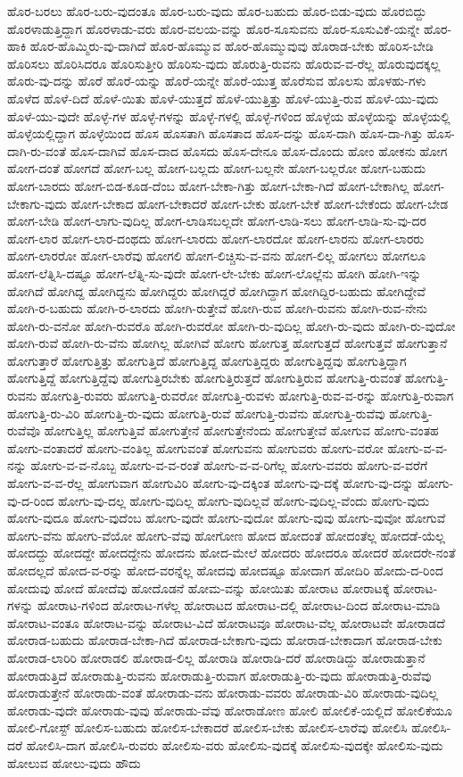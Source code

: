 {ಹೊರ-ಬರಲು
ಹೊರ-ಬರು-ವುದಂತೂ
ಹೊರ-ಬರು-ವುದು
ಹೊರ-ಬಹುದು
ಹೊರ-ಬಿಡು-ವುದು
ಹೊರಬಿದ್ದು
ಹೊರಳಾಡುತ್ತಿದ್ದಾಗ
ಹೊರಳಾಡು-ವರು
ಹೊರ-ವಲಯ-ವನ್ನು
ಹೊರ-ಸೂಸುವನು
ಹೊರ-ಸೂಸುವಿಕೆ-ಯನ್ನೇ
ಹೊರ-ಹಾಕಿ
ಹೊರ-ಹೊಮ್ಮಿರು-ವು-ದಾಗಿದೆ
ಹೊರ-ಹೊಮ್ಮುವ
ಹೊರ-ಹೊಮ್ಮುವುವು
ಹೊರಾಡ-ಬೇಕು
ಹೊರಿಸ-ಬೇಡಿ
ಹೊರಿಸಲು
ಹೊರಿಸಿದರೂ
ಹೊರಿಸುತ್ತೀರಿ
ಹೊರಿಸು-ವುದು
ಹೊರುತ್ತಿ-ರುವನು
ಹೊರುವ-ವ-ರೆಲ್ಲ
ಹೊರುವುದಕ್ಕಲ್ಲ
ಹೊರು-ವು-ದನ್ನು
ಹೊರೆ
ಹೊರೆ-ಯನ್ನು
ಹೊರೆ-ಯನ್ನೇ
ಹೊರೆ-ಯುತ್ತ
ಹೊರೆಸುವ
ಹೊಲಸು
ಹೊಳಹು-ಗಳು
ಹೊಳೆದ
ಹೊಳೆ-ದಿದೆ
ಹೊಳೆ-ಯಿತು
ಹೊಳೆ-ಯುತ್ತದೆ
ಹೊಳೆ-ಯುತ್ತಿತ್ತು
ಹೊಳೆ-ಯುತ್ತಿ-ರುವ
ಹೊಳೆ-ಯು-ವುದು
ಹೊಳೆ-ಯು-ವುದೇ
ಹೊಳ್ಳೆ-ಗಳ
ಹೊಳ್ಳೆ-ಗಳನ್ನು
ಹೊಳ್ಳೆ-ಗಳಲ್ಲಿ
ಹೊಳ್ಳೆ-ಗಳಿಂದ
ಹೊಳ್ಳೆಯ
ಹೊಳ್ಳೆಯನ್ನು
ಹೊಳ್ಳೆಯಲ್ಲಿ
ಹೊಳ್ಳೆಯಲ್ಲಿದ್ದಾಗ
ಹೊಳ್ಳೆಯಿಂದ
ಹೊಸ
ಹೊಸತಾಗಿ
ಹೊಸತಾದ
ಹೊಸ-ದನ್ನು
ಹೊಸ-ದಾಗಿ
ಹೊಸ-ದಾ-ಗಿತ್ತು
ಹೊಸ-ದಾಗಿ-ರು-ವಂತೆ
ಹೊಸ-ದಾಗಿವೆ
ಹೊಸ-ದಾದ
ಹೊಸದು
ಹೊಸ-ದೇನೂ
ಹೊಸ-ದೊಂದು
ಹೋಂ
ಹೋಕನು
ಹೋಗ
ಹೋಗ-ದಂತೆ
ಹೋಗದೆ
ಹೋಗ-ಬಲ್ಲ
ಹೋಗ-ಬಲ್ಲದು
ಹೋಗ-ಬಲ್ಲನೇ
ಹೋಗ-ಬಲ್ಲರೋ
ಹೋಗ-ಬಹುದು
ಹೋಗ-ಬಾರದು
ಹೋಗ-ಬಿಡ-ಕೂಡ-ದೆಂಬ
ಹೋಗ-ಬೇಕಾ-ಗಿತ್ತು
ಹೋಗ-ಬೇಕಾ-ಗಿದೆ
ಹೋಗ-ಬೇಕಾಗಿಲ್ಲ
ಹೋಗ-ಬೇಕಾಗು-ವುದು
ಹೋಗ-ಬೇಕಾದ
ಹೋಗ-ಬೇಕಾದರೆ
ಹೋಗ-ಬೇಕು
ಹೋಗ-ಬೇಕೆ
ಹೋಗ-ಬೇಕೆಂದು
ಹೋಗ-ಬೇಡ
ಹೋಗ-ಬೇಡಿ
ಹೋಗ-ಲಾಗು-ವುದಿಲ್ಲ
ಹೋಗ-ಲಾಡಿಸಬಲ್ಲದೇ
ಹೋಗ-ಲಾಡಿ-ಸಲು
ಹೋಗ-ಲಾಡಿ-ಸು-ವು-ದರ
ಹೋಗ-ಲಾರ
ಹೋಗ-ಲಾರ-ದಂಥದು
ಹೋಗ-ಲಾರದು
ಹೋಗ-ಲಾರದೋ
ಹೋಗ-ಲಾರನು
ಹೋಗ-ಲಾರರು
ಹೋಗ-ಲಾರರೋ
ಹೋಗ-ಲಾರೆವು
ಹೋಗಲಿ
ಹೋಗ-ಲಿಚ್ಚಿಸು-ವ-ವನು
ಹೋಗ-ಲಿಲ್ಲ
ಹೋಗಲು
ಹೋಗಲೂ
ಹೋಗ-ಲೆತ್ನಿಸಿ-ದಷ್ಟೂ
ಹೋಗ-ಲೆತ್ನಿ-ಸು-ವುದೇ
ಹೋಗ-ಲೇ-ಬೇಕು
ಹೋಗ-ಲೊಲ್ಲೆನು
ಹೋಗಿ
ಹೋಗಿ-ಇನ್ನು
ಹೋಗಿದೆ
ಹೋಗಿದ್ದ
ಹೋಗಿದ್ದನು
ಹೋಗಿದ್ದರು
ಹೋಗಿದ್ದರೆ
ಹೋಗಿದ್ದಾಗ
ಹೋಗಿದ್ದಿರ-ಬಹುದು
ಹೋಗಿದ್ದೇವೆ
ಹೋಗಿ-ರ-ಬಹುದು
ಹೋಗಿ-ರ-ಲಾರದು
ಹೋಗಿ-ರುತ್ತೇವೆ
ಹೋಗಿ-ರುವ
ಹೋಗಿ-ರುವನು
ಹೋಗಿ-ರುವ-ನೇನು
ಹೋಗಿ-ರು-ವನೋ
ಹೋಗಿ-ರುವರೊ
ಹೋಗಿ-ರುವರೋ
ಹೋಗಿ-ರು-ವುದಿಲ್ಲ
ಹೋಗಿ-ರು-ವುದು
ಹೋಗಿ-ರು-ವುದೋ
ಹೋಗಿ-ರುವೆ
ಹೋಗಿ-ರು-ವೆನು
ಹೋಗಿಲ್ಲ
ಹೋಗಿವೆ
ಹೋಗು
ಹೋಗುತ್ತ
ಹೋಗುತ್ತದೆ
ಹೋಗುತ್ತವೆ
ಹೋಗುತ್ತಾನೆ
ಹೋಗುತ್ತಾರೆ
ಹೋಗುತ್ತಿತ್ತು
ಹೋಗುತ್ತಿದೆ
ಹೋಗುತ್ತಿದ್ದ
ಹೋಗುತ್ತಿದ್ದರು
ಹೋಗುತ್ತಿದ್ದವು
ಹೋಗುತ್ತಿದ್ದಾಗ
ಹೋಗುತ್ತಿದ್ದೆ
ಹೋಗುತ್ತಿದ್ದೆವು
ಹೋಗುತ್ತಿರಬೇಕು
ಹೋಗುತ್ತಿರುತ್ತದೆ
ಹೋಗುತ್ತಿರುವ
ಹೋಗುತ್ತಿ-ರುವಂತೆ
ಹೋಗುತ್ತಿ-ರುವನು
ಹೋಗುತ್ತಿ-ರುವರು
ಹೋಗುತ್ತಿ-ರುವರೋ
ಹೋಗುತ್ತಿ-ರುವಳು
ಹೋಗುತ್ತಿ-ರುವ-ವ-ರನ್ನು
ಹೋಗುತ್ತಿ-ರುವಾಗ
ಹೋಗುತ್ತಿ-ರು-ವಿರಿ
ಹೋಗುತ್ತಿ-ರು-ವುದು
ಹೋಗುತ್ತಿ-ರುವೆ
ಹೋಗುತ್ತಿ-ರುವೆನು
ಹೋಗುತ್ತಿ-ರುವೆವು
ಹೋಗುತ್ತಿ-ರುವೆವೊ
ಹೋಗುತ್ತಿಲ್ಲ
ಹೋಗುತ್ತಿವೆ
ಹೋಗುತ್ತೇನೆ
ಹೋಗುತ್ತೇನೆಂದು
ಹೋಗುತ್ತೇವೆ
ಹೋಗುವ
ಹೋಗು-ವಂತಹ
ಹೋಗು-ವಂತಾದರೆ
ಹೋಗು-ವಂತಿಲ್ಲ
ಹೋಗುವಂತೆ
ಹೋಗುವನು
ಹೋಗುವರು
ಹೋಗು-ವರೋ
ಹೋಗು-ವ-ವ-ನನ್ನು
ಹೋಗು-ವ-ವ-ನೊಬ್ಬ
ಹೋಗು-ವ-ವ-ರಂತೆ
ಹೋಗು-ವ-ವ-ರಿಗೆಲ್ಲ
ಹೋಗು-ವವರು
ಹೋಗು-ವ-ವರೆಗೆ
ಹೋಗು-ವ-ವ-ರೆಲ್ಲ
ಹೋಗುವಾಗ
ಹೋಗುವಿರಿ
ಹೋಗು-ವು-ದಕ್ಕಿಂತ
ಹೋಗು-ವು-ದಕ್ಕೆ
ಹೋಗು-ವು-ದನ್ನು
ಹೋಗು-ವು-ದ-ರಿಂದ
ಹೋಗು-ವು-ದಲ್ಲ
ಹೋಗು-ವುದಿಲ್ಲ
ಹೋಗು-ವುದಿಲ್ಲವೆ
ಹೋಗು-ವುದಿಲ್ಲ-ವೆಂದು
ಹೋಗು-ವುದು
ಹೋಗು-ವುದೂ
ಹೋಗು-ವುದೆಂಬ
ಹೋಗು-ವುದೇ
ಹೋಗು-ವುದೋ
ಹೋಗು-ವುವು
ಹೋಗು-ವುವೋ
ಹೋಗುವೆ
ಹೋಗು-ವೆನು
ಹೋಗು-ವೆಯೋ
ಹೋಗು-ವೆವು
ಹೋಗೋಣ
ಹೋದ
ಹೋದಂತೆ
ಹೋದಂತೆಲ್ಲ
ಹೋದಡೆ-ಯೆಲ್ಲ
ಹೋದದ್ದು
ಹೋದದ್ದೇ
ಹೋದದ್ದೇನು
ಹೋದನು
ಹೋದ-ಮೇಲೆ
ಹೋದರು
ಹೋದರೂ
ಹೋದರೆ
ಹೋದರೇ-ನಂತೆ
ಹೋದಲ್ಲದೆ
ಹೋದ-ವ-ರನ್ನು
ಹೋದ-ವರನ್ನೆಲ್ಲ
ಹೋದವು
ಹೋದಷ್ಟೂ
ಹೋದಾಗ
ಹೋದಿರಿ
ಹೋದು-ದ-ರಿಂದ
ಹೋದುವು
ಹೋದೆ
ಹೋದೆವು
ಹೋದೊಡನೆ
ಹೋಮ-ವನ್ನು
ಹೋಯಿತು
ಹೋರಾಟ
ಹೋರಾಟಕ್ಕೆ
ಹೋರಾಟ-ಗಳನ್ನು
ಹೋರಾಟ-ಗಳಿಂದ
ಹೋರಾಟ-ಗಳೆಲ್ಲ
ಹೋರಾಟದ
ಹೋರಾಟ-ದಲ್ಲಿ
ಹೋರಾಟ-ದಿಂದ
ಹೋರಾಟ-ಮಾಡಿ
ಹೋರಾಟ-ವಂತೂ
ಹೋರಾಟ-ವನ್ನು
ಹೋರಾಟ-ವಿದೆ
ಹೋರಾಟವೂ
ಹೋರಾಟ-ವೆಲ್ಲ
ಹೋರಾಟವೇ
ಹೋರಾಡದೆ
ಹೋರಾಡ-ಬಹುದು
ಹೋರಾಡ-ಬೇಕಾ-ಗಿದೆ
ಹೋರಾಡ-ಬೇಕಾಗು-ವುದು
ಹೋರಾಡ-ಬೇಕಾದಾಗ
ಹೋರಾಡ-ಬೇಕು
ಹೋರಾಡ-ಲಾರಿರಿ
ಹೋರಾಡಲಿ
ಹೋರಾಡ-ಲಿಲ್ಲ
ಹೋರಾಡಿ
ಹೋರಾಡಿ-ದರೆ
ಹೋರಾಡಿದ್ದು
ಹೋರಾಡುತ್ತಾನೆ
ಹೋರಾಡುತ್ತಿದೆ
ಹೋರಾಡುತ್ತಿ-ರುವನು
ಹೋರಾಡುತ್ತಿ-ರುವಾಗ
ಹೋರಾಡುತ್ತಿ-ರು-ವುದು
ಹೋರಾಡುತ್ತಿ-ರುವೆವು
ಹೋರಾಡುತ್ತೇನೆ
ಹೋರಾಡು-ವಂತೆ
ಹೋರಾಡು-ವನು
ಹೋರಾಡು-ವವರು
ಹೋರಾಡು-ವಿರಿ
ಹೋರಾಡು-ವುದಿಲ್ಲ
ಹೋರಾಡು-ವುದೇ
ಹೋರಾಡು-ವುವು
ಹೋರಾಡು-ವೆವು
ಹೋರಾಡೋಣ
ಹೋಲಿ
ಹೋಲಿಕೆ-ಯಲ್ಲಿದೆ
ಹೋಲಿಕೆಯೂ
ಹೋಲಿ-ಗೋಸ್ಟ್
ಹೋಲಿಸ-ಬಹುದು
ಹೋಲಿಸ-ಬೇಕಾದರೆ
ಹೋಲಿಸ-ಬೇಕು
ಹೋಲಿಸ-ಲಾರೆವು
ಹೋಲಿಸಿ
ಹೋಲಿಸಿ-ದರೆ
ಹೋಲಿಸಿ-ದಾಗ
ಹೋಲಿಸಿ-ರುವರು
ಹೋಲಿಸು-ವರು
ಹೋಲಿಸು-ವುದಕ್ಕೆ
ಹೋಲಿಸು-ವುದಕ್ಕೇ
ಹೋಲಿಸು-ವುದು
ಹೋಲುವ
ಹೋಲು-ವುದು
ಹೌದು
}
